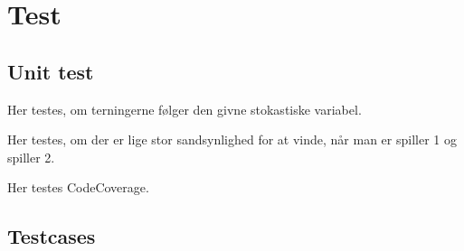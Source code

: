 \chapter{Test}

\section{Unit test}
Her testes, om terningerne følger den givne stokastiske variabel.

Her testes, om der er lige stor sandsynlighed for at vinde, når man er spiller 1 og spiller 2.

Her testes CodeCoverage.
\section{Testcases}
